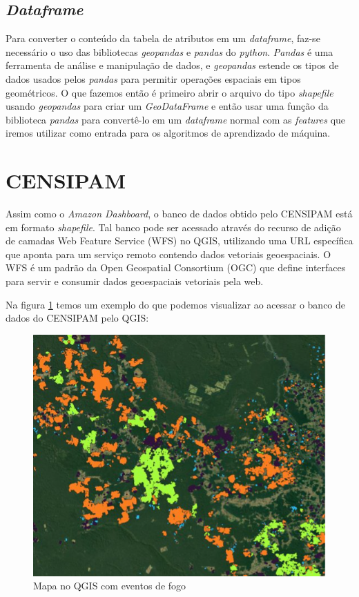 \subsection{\textit{Dataframe}}

Para converter o conteúdo da tabela de atributos em um \textit{dataframe}, faz-se necessário o uso das bibliotecas \textit{geopandas} e \textit{pandas} do \textit{python}. \textit{Pandas} é uma ferramenta de análise e manipulação de dados, e \textit{geopandas} estende os tipos de dados usados pelos \textit{pandas} para permitir operações espaciais em tipos geométricos. O que fazemos então é primeiro abrir o arquivo do tipo \textit{shapefile} usando \textit{geopandas} para criar um \textit{GeoDataFrame} e então usar uma função da biblioteca \textit{pandas} para convertê-lo em um \textit{dataframe} normal com as \textit{features} que iremos utilizar como entrada para os algoritmos de aprendizado de máquina.

\section{CENSIPAM}
\label{sec:censipamBD}

Assim como o \textit{Amazon Dashboard}, o banco de dados obtido pelo CENSIPAM está em formato \textit{shapefile}. Tal banco pode ser acessado através do recurso de adição de camadas Web Feature Service (WFS) no QGIS, utilizando uma URL específica que aponta para um serviço remoto contendo dados vetoriais geoespaciais. O WFS é um padrão da Open Geospatial Consortium (OGC) que define interfaces para servir e consumir dados geoespaciais vetoriais pela web.

Na figura \ref{fig:qgiscensipam} temos um exemplo do que podemos visualizar ao acessar o banco de dados do CENSIPAM pelo QGIS:

\begin{figure}[htb]
	\centering
	\begin{minipage}{0.6\linewidth}
		\centering
		\includegraphics[width=\linewidth]{tg1/figuras/mapa_censipam.png}
		\caption{Mapa no QGIS com eventos de fogo} \label{fig:qgiscensipam}
	\end{minipage}
\end{figure}

